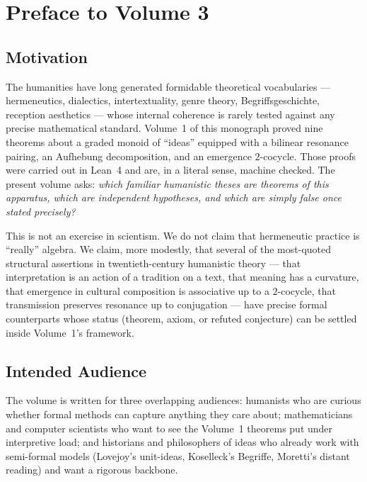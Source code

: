 \documentclass[11pt,oneside]{book}
\begin{document}
\tableofcontents

\mainmatter

\chapter*{Preface to Volume 3}

\section*{Motivation}
The humanities have long generated formidable theoretical
vocabularies --- hermeneutics, dialectics, intertextuality, genre
theory, Begriffsgeschichte, reception aesthetics --- whose internal
coherence is rarely tested against any precise mathematical standard.
Volume~1 of this monograph proved nine theorems about a graded
monoid of ``ideas'' equipped with a bilinear resonance pairing, an
Aufhebung decomposition, and an emergence $2$-cocycle. Those proofs
were carried out in Lean~4 and are, in a literal sense, machine
checked. The present volume asks: \emph{which familiar humanistic
theses are theorems of this apparatus, which are independent
hypotheses, and which are simply false once stated precisely?}

This is not an exercise in scientism. We do not claim that hermeneutic
practice is ``really'' algebra. We claim, more modestly, that several
of the most-quoted structural assertions in twentieth-century
humanistic theory --- that interpretation is an action of a tradition
on a text, that meaning has a curvature, that emergence in cultural
composition is associative up to a $2$-cocycle, that transmission
preserves resonance up to conjugation --- have precise formal
counterparts whose status (theorem, axiom, or refuted conjecture) can
be settled inside Volume~1's framework.

\section*{Intended Audience}
The volume is written for three overlapping audiences: humanists who
are curious whether formal methods can capture anything they care
about; mathematicians and computer scientists who want to see the
Volume~1 theorems put under interpretive load; and historians and
philosophers of ideas who already work with semi-formal models
(Lovejoy's unit-ideas, Koselleck's Begriffe, Moretti's distant
reading) and want a rigorous backbone.
\end{document}
